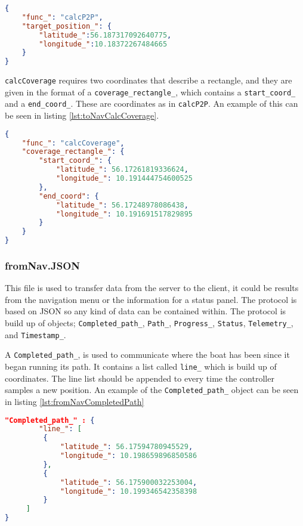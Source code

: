 \begin{lstlisting}[caption = {Example of a calcP2P call in the toNav.JSON}, captionpos=b, label={lst:toNavCalcP2P}, language=json,firstnumber=1]
{
	"func_": "calcP2P",
	"target_position_": {
		"latitude_":56.187317092640775,
		"longitude_":10.18372267484665
	}
}
\end{lstlisting}

\texttt{calcCoverage} requires two coordinates that describe a rectangle, and they are given in the format of a \texttt{coverage_rectangle_}, which contains a \texttt{start_coord_} and a \texttt{end_coord_}. These are coordinates as in \texttt{calcP2P}. An example of this can be seen in listing \ref{lst:toNavCalcCoverage}.

\begin{lstlisting}[caption = {Example of a calcCoverage call in the toNav.JSON}, captionpos=b, label={lst:toNavCalcCoverage}, language=json,firstnumber=1]
{
	"func_": "calcCoverage",
	"coverage_rectangle_": {
		"start_coord_": {
			"latitude_": 56.17261819336624,
			"longitude_": 10.191444754600525
		},
		"end_coord": {
			"latitude_": 56.17248978086438,
			"longitude_": 10.191691517829895
		}
	}
}
\end{lstlisting}

\subsubsection{fromNav.JSON}
\label{sec:protocol_fromNav}
This file is used to transfer data from the server to the client, it could be results from the navigation menu or the information for a status panel. 
The protocol is based on JSON so any kind of data can be contained within. The protocol is build up of objects;  \texttt{Completed_path_}, \texttt{Path_}, \texttt{Progress_}, \texttt{Status}, \texttt{Telemetry_}, and \texttt{Timestamp_}.

A \texttt{Completed_path_}, is used to communicate where the boat has been since it began running its path. It contains a list called \texttt{line_} which is build up of coordinates.
The line list should be appended to every time the controller samples a new position. An example of the \texttt{Completed_path_} object can be seen in listing \ref{lst:fromNavCompletedPath}

\begin{lstlisting}[caption = {Example of a Completed_path_ object in fromNav.JSON}, captionpos=b, label={lst:fromNavCompletedPath}, language=json,firstnumber=1]
"Completed_path_" : {
		"line_": [
         {
             "latitude_": 56.17594780945529,
             "longitude_": 10.198659896850586
         },
         {
             "latitude_": 56.175900032253004,
             "longitude_": 10.199346542358398
         }
     ]
}
\end{lstlisting}

